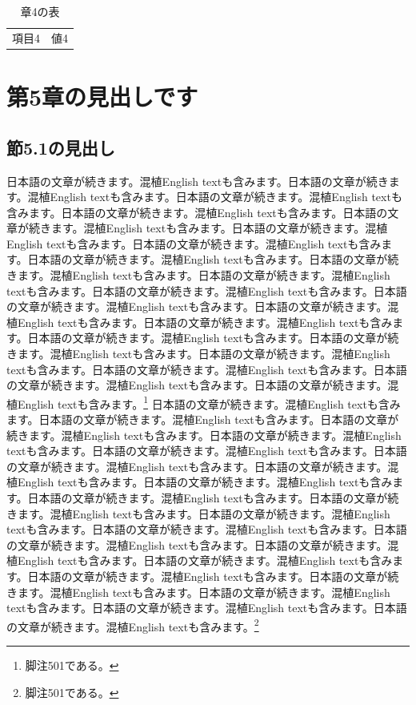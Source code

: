 \documentclass[pdflatex,book]{jlreq}
\begin{document}
\begin{table}[htbp]\centering\caption{章4の表}\begin{tabular}{cc}項目4 & 値4\\\end{tabular}\end{table}

\chapter{第5章の見出しです}
\section{節5.1の見出し}
日本語の文章が続きます。混植English textも含みます。日本語の文章が続きます。混植English textも含みます。日本語の文章が続きます。混植English textも含みます。日本語の文章が続きます。混植English textも含みます。日本語の文章が続きます。混植English textも含みます。日本語の文章が続きます。混植English textも含みます。日本語の文章が続きます。混植English textも含みます。日本語の文章が続きます。混植English textも含みます。日本語の文章が続きます。混植English textも含みます。日本語の文章が続きます。混植English textも含みます。日本語の文章が続きます。混植English textも含みます。日本語の文章が続きます。混植English textも含みます。日本語の文章が続きます。混植English textも含みます。日本語の文章が続きます。混植English textも含みます。日本語の文章が続きます。混植English textも含みます。日本語の文章が続きます。混植English textも含みます。日本語の文章が続きます。混植English textも含みます。日本語の文章が続きます。混植English textも含みます。日本語の文章が続きます。混植English textも含みます。日本語の文章が続きます。混植English textも含みます。\footnote{脚注501である。}
日本語の文章が続きます。混植English textも含みます。日本語の文章が続きます。混植English textも含みます。日本語の文章が続きます。混植English textも含みます。日本語の文章が続きます。混植English textも含みます。日本語の文章が続きます。混植English textも含みます。日本語の文章が続きます。混植English textも含みます。日本語の文章が続きます。混植English textも含みます。日本語の文章が続きます。混植English textも含みます。日本語の文章が続きます。混植English textも含みます。日本語の文章が続きます。混植English textも含みます。日本語の文章が続きます。混植English textも含みます。日本語の文章が続きます。混植English textも含みます。日本語の文章が続きます。混植English textも含みます。日本語の文章が続きます。混植English textも含みます。日本語の文章が続きます。混植English textも含みます。日本語の文章が続きます。混植English textも含みます。日本語の文章が続きます。混植English textも含みます。日本語の文章が続きます。混植English textも含みます。日本語の文章が続きます。混植English textも含みます。日本語の文章が続きます。混植English textも含みます。\footnote{脚注501である。}
\end{document}
